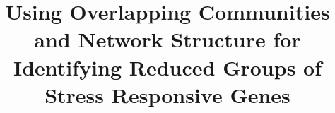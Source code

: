 \documentclass{bmcart}
\begin{document}
\begin{frontmatter}

\begin{fmbox}


\title{Using Overlapping Communities and Network Structure for
  Identifying Reduced Groups of Stress Responsive Genes}


\author[
  addressref={aff1},                   %
  corref={aff1},                      %
  email={camila.riccio@javerianacali.edu.co}   %
]{ }
\author[
  addressref={aff2},
  email={jfinke@javerianacali.edu.co}
]{ }
\author[
  addressref={aff2},
  email={camilo.rocha@javerianacali.edu.co}
]{ }


\address[id=aff1]{%
  ,  %
  ,               %
  ,                                              %
}


\end{fmbox}
\end{frontmatter}
\end{document}
